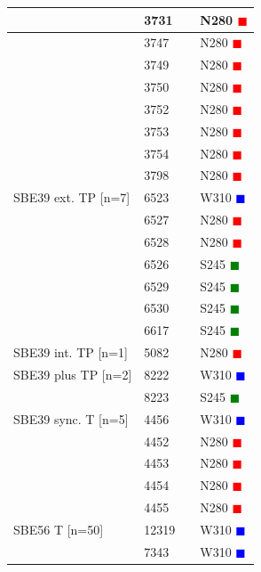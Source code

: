\documentclass{article}
\begin{document}
\begin{tabularx}{\linewidth}{|X|l|l|X|}
 & 3731 &  & N280 \textcolor{red}{$\blacksquare$} \\ \hline
 & 3747 &  & N280 \textcolor{red}{$\blacksquare$} \\ \hline
 & 3749 &  & N280 \textcolor{red}{$\blacksquare$} \\ \hline
 & 3750 &  & N280 \textcolor{red}{$\blacksquare$} \\ \hline
 & 3752 &  & N280 \textcolor{red}{$\blacksquare$} \\ \hline
 & 3753 &  & N280 \textcolor{red}{$\blacksquare$} \\ \hline
 & 3754 &  & N280 \textcolor{red}{$\blacksquare$} \\ \hline
 & 3798 &  & N280 \textcolor{red}{$\blacksquare$} \\ \hline
SBE39 ext. TP [n=7] & 6523 &  & W310 \textcolor{blue}{$\blacksquare$} \\ \hline
 & 6527 &  & N280 \textcolor{red}{$\blacksquare$} \\ \hline
 & 6528 &  & N280 \textcolor{red}{$\blacksquare$} \\ \hline
 & 6526 &  & S245 \textcolor{green}{$\blacksquare$} \\ \hline
 & 6529 &  & S245 \textcolor{green}{$\blacksquare$} \\ \hline
 & 6530 &  & S245 \textcolor{green}{$\blacksquare$} \\ \hline
 & 6617 &  & S245 \textcolor{green}{$\blacksquare$} \\ \hline
SBE39 int. TP [n=1] & 5082 &  & N280 \textcolor{red}{$\blacksquare$} \\ \hline
SBE39 plus TP [n=2] & 8222 &  & W310 \textcolor{blue}{$\blacksquare$} \\ \hline
 & 8223 &  & S245 \textcolor{green}{$\blacksquare$} \\ \hline
SBE39 sync. T [n=5] & 4456 &  & W310 \textcolor{blue}{$\blacksquare$} \\ \hline
 & 4452 &  & N280 \textcolor{red}{$\blacksquare$} \\ \hline
 & 4453 &  & N280 \textcolor{red}{$\blacksquare$} \\ \hline
 & 4454 &  & N280 \textcolor{red}{$\blacksquare$} \\ \hline
 & 4455 &  & N280 \textcolor{red}{$\blacksquare$} \\ \hline
SBE56 T [n=50] & 12319 &  & W310 \textcolor{blue}{$\blacksquare$} \\ \hline
 & 7343 &  & W310 \textcolor{blue}{$\blacksquare$} \\ \hline

\end{tabularx}
\end{document}
